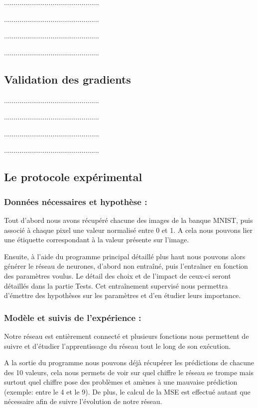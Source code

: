 \documentclass[12pt,a4paper]{article}
\begin{document}
.................................................

.................................................

.................................................

.................................................
\subsection{Validation des gradients}

.................................................

.................................................

.................................................

.................................................

\subsection{Le protocole expérimental}

\subsubsection{Données nécessaires et hypothèse :}

Tout d'abord nous avons récupéré chacune des images de la banque MNIST, puis associé à chaque pixel une valeur normalisé entre 0 et 1. A cela nous pouvons lier une étiquette correspondant à la valeur présente sur l'image.

Ensuite, à l'aide du programme principal détaillé plus haut nous pouvons alors générer le réseau de neurones, d'abord non entraîné, puis l'entraîner en fonction des paramètres voulus. Le détail des choix et de l'impact de ceux-ci seront détaillés dans la partie Tests.
Cet entraînement supervisé nous permettra d'émettre des hypothèses sur les paramètres et d'en étudier leurs importance.

\subsubsection{Modèle et suivis de l’expérience :}

Notre réseau est entièrement connecté et plusieurs fonctions nous permettent de suivre et d'étudier l'apprentissage du réseau tout le long de son exécution. 

A la sortie du programme nous pouvons déjà récupérer les prédictions de chacune des 10 valeurs, cela nous permets de voir sur quel chiffre le réseau se trompe mais surtout quel chiffre pose des problèmes et amènes à une mauvaise prédiction (exemple: entre le 4 et le 9).
De plus, le calcul de la MSE est effectué autant que nécessaire afin de suivre l'évolution de notre réseau.
\end{document}
